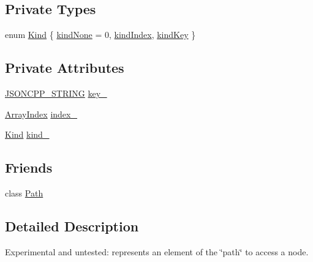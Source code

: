 \subsection*{Private Types}
\begin{DoxyCompactItemize}
\item 
enum \hyperlink{class_json_1_1_path_argument_a2420bbad778573c147e578701b84d9b9}{Kind} \{ \hyperlink{class_json_1_1_path_argument_a2420bbad778573c147e578701b84d9b9afa8c7a261ccb8ae5171d2372321c2698}{kind\+None} = 0, 
\hyperlink{class_json_1_1_path_argument_a2420bbad778573c147e578701b84d9b9ae5a976b898111903334cb131f5e03dc4}{kind\+Index}, 
\hyperlink{class_json_1_1_path_argument_a2420bbad778573c147e578701b84d9b9a74f5968d06c01701b7a46092c33ba7d1}{kind\+Key}
 \}
\end{DoxyCompactItemize}
\subsection*{Private Attributes}
\begin{DoxyCompactItemize}
\item 
\hyperlink{json_8h_a1e723f95759de062585bc4a8fd3fa4be}{J\+S\+O\+N\+C\+P\+P\+\_\+\+S\+T\+R\+I\+NG} \hyperlink{class_json_1_1_path_argument_af4024368548ff730ef2bed97d6f1ca43}{key\+\_\+}
\item 
\hyperlink{namespace_json_a8048e741f2177c3b5d9ede4a5b8c53c2}{Array\+Index} \hyperlink{class_json_1_1_path_argument_afd5857d1b6bfaae6961333bdae7bd5ec}{index\+\_\+}
\item 
\hyperlink{class_json_1_1_path_argument_a2420bbad778573c147e578701b84d9b9}{Kind} \hyperlink{class_json_1_1_path_argument_ad4bc4b544b155a3d9c7788572ecf991b}{kind\+\_\+}
\end{DoxyCompactItemize}
\subsection*{Friends}
\begin{DoxyCompactItemize}
\item 
class \hyperlink{class_json_1_1_path_argument_a4877239a6b7f09fbf5a61ca68a49d74c}{Path}
\end{DoxyCompactItemize}


\subsection{Detailed Description}
Experimental and untested\+: represents an element of the \char`\"{}path\char`\"{} to access a node. 

